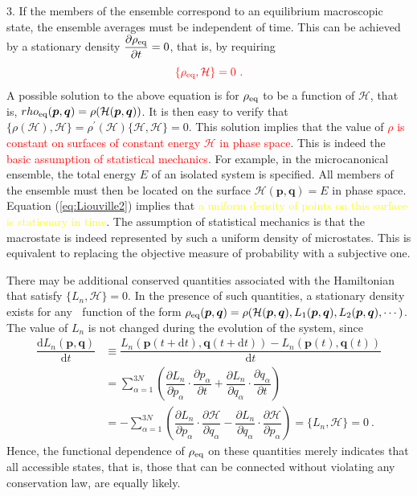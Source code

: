 \documentclass[12pt,a4paper]{article}
\renewcommand{\vec}[1]{\boldsymbol{#1}}
\newcommand{\dif}{\mathrm{d}}
\begin{document}
3. If the members of the ensemble correspond to an equilibrium macroscopic state, the ensemble averages must be independent of time. This can be achieved by a stationary density $\dfrac{\partial \rho_{\rm eq}}{\partial t} = 0$, that is, by requiring
\begin{equation}
\color{red} \{\rho_{\rm eq}, \mathcal H \} = 0 ~.
\end{equation}
A  possible solution to the above equation is for $\rho_{\rm eq}$ to be a function of $\mathcal H$, that is, $rho_{\rm eq}(\vec{p}, \vec{q}) =\rho(\mathcal H(\vec{p}, \vec{q}) )$. It is then easy to verify that $\{\rho(\mathcal H), \mathcal H \} = \rho^\prime(\mathcal H)\{\mathcal H, \mathcal H \} = 0$. This solution implies that the value of \textcolor{red}{$\rho$ is constant on surfaces of constant energy $\mathcal H$ in phase space}. This is indeed the \textcolor{red}{basic assumption of statistical mechanics}. For example, in the microcanonical ensemble, the total energy $E$ of an isolated system is specified. All members of the ensemble must then be located on the surface $\mathcal H(\vec{p}, \vec{q}) = E$ in phase space. Equation (\ref{eq:Liouville2}) implies that \textcolor{yellow}{a uniform density of points on this surface is stationary in time}. The assumption of statistical mechanics is that the macrostate is indeed represented by such a uniform density of microstates. This is equivalent to replacing the objective measure of probability with a subjective one.

There may be additional conserved quantities associated with the Hamiltonian that satisfy $\{L_n, \mathcal H \}= 0$. In the presence of such quantities, a stationary density exists for any 􏰟􏰐function of the form \textcolor{red}{$\rho_{\rm eq}(\vec{p}, \vec{q}) = \rho(\mathcal H(\vec{p}, \vec{q}), L_1(\vec{p}, \vec{q}), L_2(\vec{p}, \vec{q}), \cdots)$}. The value of $L_n$ is not changed during the evolution of the system, since
\begin{align}
\nonumber \dfrac{\dif L_n(\vec{p}, \vec{q})}{\dif t} &\equiv \dfrac{L_n(\vec{p}(t+\dif t), \vec{q}(t+\dif t)) - L_n(\vec{p}(t), \vec{q}(t))}{\dif t} \\
\nonumber &= \sum_{\alpha =1}^{3N} \left(\dfrac{\partial L_n}{\partial p_\alpha}\cdot \dfrac{\partial p_\alpha}{\partial t} +\dfrac{\partial L_n}{\partial q_\alpha}\cdot \dfrac{\partial q_\alpha}{\partial t}  \right) \\
&= -\sum_{\alpha =1}^{3N} \left(\dfrac{\partial L_n}{\partial p_\alpha}\cdot \dfrac{\partial \mathcal H}{\partial q_\alpha} -\dfrac{\partial L_n}{\partial q_\alpha}\cdot \dfrac{\partial \mathcal H}{\partial p_\alpha}  \right) = \{L_n, \mathcal H \} = 0 ~.
\end{align}
Hence, the functional dependence of $\rho_{\rm eq}$ on these quantities merely indicates that all accessible states, that is, those that can be connected without violating any conservation law, are equally likely.
\end{document}

